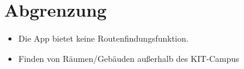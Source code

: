 \section{Abgrenzung}

\begin{itemize}

    \item Die App bietet keine \Gls{Routenfindungsfunktion}. 
    \item Finden von Räumen/Gebäuden außerhalb des \Gls{KIT}-Campus

\end{itemize}